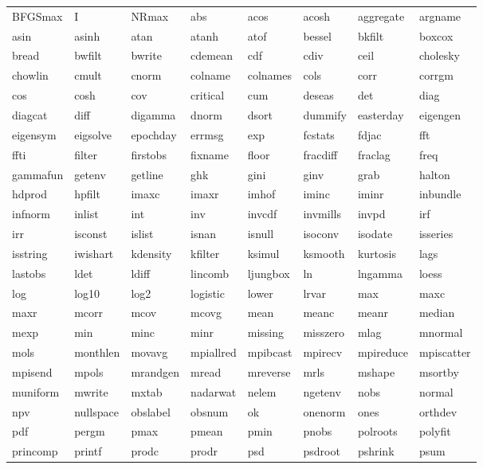 \begin{tabular}{llllllll}
BFGSmax & I & NRmax & abs & acos & acosh & aggregate & argname \\
asin & asinh & atan & atanh & atof & bessel & bkfilt & boxcox \\
bread & bwfilt & bwrite & cdemean & cdf & cdiv & ceil & cholesky \\
chowlin & cmult & cnorm & colname & colnames & cols & corr & corrgm \\
cos & cosh & cov & critical & cum & deseas & det & diag \\
diagcat & diff & digamma & dnorm & dsort & dummify & easterday & eigengen \\
eigensym & eigsolve & epochday & errmsg & exp & fcstats & fdjac & fft \\
ffti & filter & firstobs & fixname & floor & fracdiff & fraclag & freq \\
gammafun & getenv & getline & ghk & gini & ginv & grab & halton \\
hdprod & hpfilt & imaxc & imaxr & imhof & iminc & iminr & inbundle \\
infnorm & inlist & int & inv & invcdf & invmills & invpd & irf \\
irr & isconst & islist & isnan & isnull & isoconv & isodate & isseries \\
isstring & iwishart & kdensity & kfilter & ksimul & ksmooth & kurtosis & lags \\
lastobs & ldet & ldiff & lincomb & ljungbox & ln & lngamma & loess \\
log & log10 & log2 & logistic & lower & lrvar & max & maxc \\
maxr & mcorr & mcov & mcovg & mean & meanc & meanr & median \\
mexp & min & minc & minr & missing & misszero & mlag & mnormal \\
mols & monthlen & movavg & mpiallred & mpibcast & mpirecv & mpireduce & mpiscatter \\
mpisend & mpols & mrandgen & mread & mreverse & mrls & mshape & msortby \\
muniform & mwrite & mxtab & nadarwat & nelem & ngetenv & nobs & normal \\
npv & nullspace & obslabel & obsnum & ok & onenorm & ones & orthdev \\
pdf & pergm & pmax & pmean & pmin & pnobs & polroots & polyfit \\
princomp & printf & prodc & prodr & psd & psdroot & pshrink & psum \\

\end{tabular}
